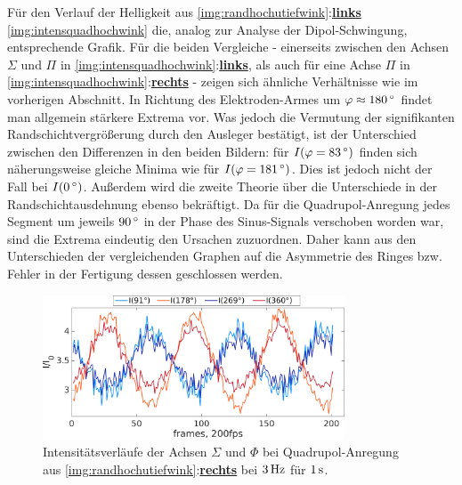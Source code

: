 \documentclass[numbers=noenddot,a4paper]{scrartcl}
\newcommand{\degree}{^\circ}
\newcommand{\fett}[1]{\textbf{#1}}
\begin{document}
					Für den Verlauf der Helligkeit aus \ref{img:randhochutiefwink}:\underline{\fett{links}} \ref{img:intensquadhochwink} die, analog zur Analyse der Dipol-Schwingung, entsprechende Grafik. Für die beiden Vergleiche - einerseits zwischen den Achsen $\Sigma$ und $\Pi$ in \ref{img:intensquadhochwink}:\underline{\fett{links}}, als auch für eine Achse $\Pi$ in \ref{img:intensquadhochwink}:\underline{\fett{rechts}} - zeigen sich ähnliche Verhältnisse wie im vorherigen Abschnitt. In Richtung des Elektroden-Armes um $\varphi\approx\unit[180]{\degree}$ findet man allgemein stärkere Extrema vor. Was jedoch die Vermutung der signifikanten Randschichtvergrößerung durch den Ausleger bestätigt, ist der Unterschied zwischen den Differenzen in den beiden Bildern: für $I(\varphi=\unit[83]{\degree})$ finden sich näherungsweise gleiche Minima wie für $I(\varphi=\unit[181]{\degree})$. Dies ist jedoch nicht der Fall bei $I(\unit[0]{\degree})$. Außerdem wird die zweite Theorie über die Unterschiede in der Randschichtausdehnung ebenso bekräftigt. Da für die Quadrupol-Anregung jedes Segment um jeweils $\unit[90]{\degree}$ in der Phase des Sinus-Signals verschoben worden war, sind die Extrema eindeutig den Ursachen zuzuordnen. Daher kann aus den Unterschieden der vergleichenden Graphen auf die Asymmetrie des Ringes bzw. Fehler in der Fertigung dessen geschlossen werden.

						\begin{figure}[!t]
							\centering
							\includegraphics[width=0.8\textwidth,height=0.45\textwidth]{figs/auswertung/intensquad91269u1782603Hz1sek.png}
							\caption{Intensitätsverläufe der Achsen $\Sigma$ und $\Phi$ bei Quadrupol-Anregung aus \ref{img:randhochutiefwink}:\underline{\fett{rechts}} bei $\unit[3]{Hz}$ für $\unit[1]{s}$. }
							\label{img:intensquadalles}
						\end{figure}
\end{document}
